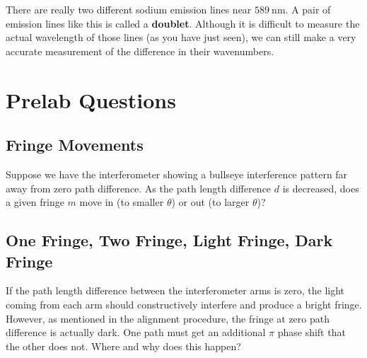 \documentclass[]{manual}
\begin{document}
    There are really two different sodium emission lines near $\SI{589}{\nano\meter}$.
    A pair of emission lines like this is called a \textbf{doublet}.
    Although it is difficult to measure the actual wavelength of those lines (as you have just seen), we can still make a very accurate measurement of the difference in their wavenumbers.


    \newpage
    \FloatBarrier

    \section{Prelab Questions}
    \setcounter{subsection}{0}

    \subsection{Fringe Movements}

    Suppose we have the interferometer showing a bullseye interference pattern far away from zero path difference.
    As the path length difference $d$ is decreased, does a given fringe $m$ move in (to smaller $\theta$) or out (to larger $\theta$)?


    \subsection{One Fringe, Two Fringe, Light Fringe, Dark Fringe}

    If the path length difference between the interferometer arms is zero, the light coming from each arm should constructively interfere and produce a bright fringe.
    However, as mentioned in the alignment procedure, the fringe at zero path difference is actually dark.
    One path must get an additional $\pi$ phase shift that the other does not.
    Where and why does this happen?

\end{document}
